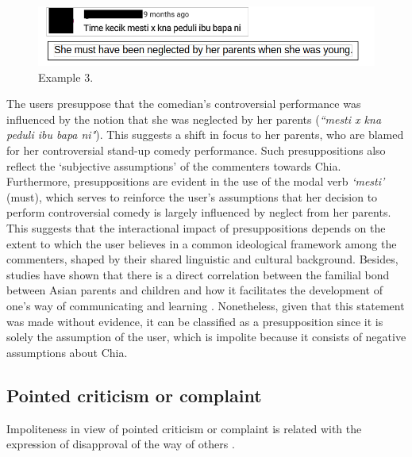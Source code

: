 \documentclass[english]{textolivre}
\begin{document}
\begin{figure}[h!]
    \centering
    \begin{minipage}{0.70\linewidth}
    \includegraphics[width=\linewidth]{imagens/Fig5.png}
    \caption{Example 3.}
    \label{example-3}
    \end{minipage}
\end{figure}

The users presuppose that the comedian’s controversial performance was influenced by the notion that she was neglected by her parents (\textit{``mesti x kna peduli ibu bapa ni"}). This suggests a shift in focus to her parents, who are blamed for her controversial stand-up comedy performance. Such presuppositions also reflect the ‘subjective assumptions’ \cite{chen2019} of the commenters towards Chia. Furthermore, presuppositions are evident in the use of the modal verb \textit{‘mesti’} (must), which serves to reinforce the user’s assumptions that her decision to perform controversial comedy is largely influenced by neglect from her parents. This suggests that the interactional impact of presuppositions depends on the extent to which the user believes in a common ideological framework among the commenters, shaped by their shared linguistic and cultural background. Besides, studies have shown that there is a direct correlation between the familial bond between Asian parents and children and how it facilitates the development of one’s way of communicating and learning \cite{awde2009}. Nonetheless, given that this statement was made without evidence, it can be classified as a presupposition since it is solely the assumption of the user, which is impolite because it consists of negative assumptions about Chia.

\subsection{Pointed criticism or complaint}
Impoliteness in view of pointed criticism or complaint is related with the expression of disapproval of the way of others \cite{kapoor2022}.
\end{document}

